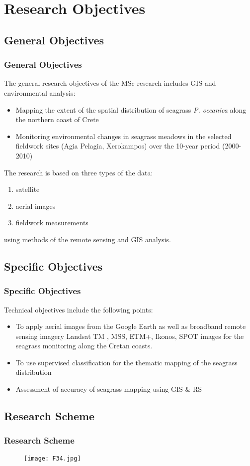 \documentclass[pdflatex,compress]{beamer}
\begin{document}
\section{Research Objectives}
\subsection{General Objectives}
\begin{frame}\frametitle{General Objectives}
The general research objectives of the MSc research includes GIS and environmental analysis:
\begin{itemize}
	\item Mapping the extent of the spatial distribution of seagrass \emph{P. oceanica} along the northern coast of Crete
	\item Monitoring environmental changes in seagrass meadows in the selected fieldwork sites (Agia Pelagia, Xerokampos) over the 10-year period (2000-2010)
\end{itemize}
The research is based on three types of the data:
\begin{enumerate}
	\item satellite
	\item aerial images
	\item  fieldwork measurements
\end{enumerate}
using methods of the remote sensing and GIS analysis.
\end{frame}

\subsection{Specific Objectives}
\begin{frame}\frametitle{Specific Objectives}
Technical objectives include the following points: 
\begin{itemize}
	\item To apply aerial images from the Google Earth as well as broadband remote sensing imagery Landsat TM , MSS, ETM+, Ikonos, SPOT images for the seagrass monitoring along the Cretan coasts.
	\item To use supervised classification for the thematic mapping of the seagrass distribution
	\item Assessment of accuracy of seagrass mapping using GIS \& RS
\end{itemize}
\end{frame}

\subsection{Research Scheme}
\begin{frame}\frametitle{Research Scheme}
\begin{figure}[H]
	\centering
		\texttt{[image: F34.jpg]}
\end{figure}
\end{frame}
\end{document}
